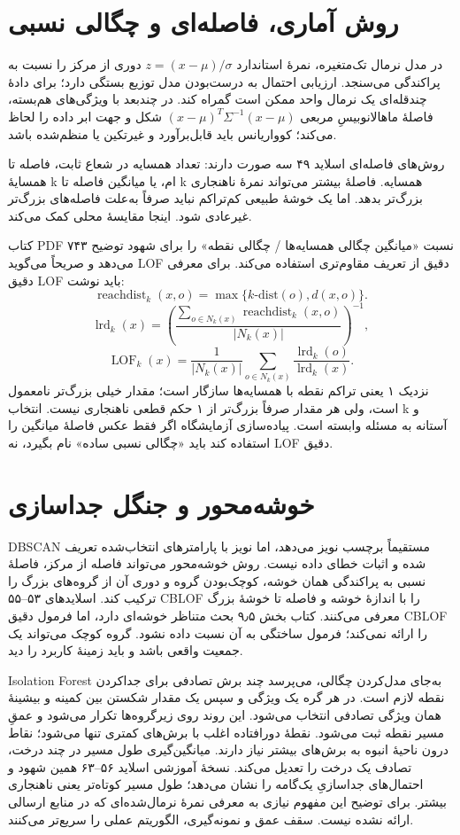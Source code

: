 \documentclass[12pt,a4paper,oneside]{report}
\newcounter{ex}[chapter]
\begin{document}
\section{روش آماری، فاصله‌ای و چگالی نسبی}

در مدل نرمال تک‌متغیره، نمرهٔ استاندارد \(z=(x-\mu)/\sigma\) دوری از مرکز را نسبت به پراکندگی می‌سنجد. ارزیابی احتمال به درست‌بودن مدل توزیع بستگی دارد؛ برای دادهٔ چندقله‌ای یک نرمال واحد ممکن است گمراه کند. در چندبعد با ویژگی‌های هم‌بسته، فاصلهٔ ماهالانوبیسِ مربعی \((x-\mu)^T\Sigma^{-1}(x-\mu)\) شکل و جهت ابر داده را لحاظ می‌کند؛ کوواریانس باید قابل‌برآورد و غیرتکین یا منظم‌شده باشد.

روش‌های فاصله‌ای اسلاید ۴۹ سه صورت دارند: تعداد همسایه در شعاع ثابت، فاصله تا همسایهٔ k ام، یا میانگین فاصله تا k همسایه. فاصلهٔ بیشتر می‌تواند نمرهٔ ناهنجاری بزرگ‌تر بدهد. اما یک خوشهٔ طبیعی کم‌تراکم نباید صرفاً به‌علت فاصله‌های بزرگ‌تر غیرعادی شود. اینجا مقایسهٔ محلی کمک می‌کند.

کتاب PDF ۷۴۳ نسبت «میانگین چگالی همسایه‌ها / چگالی نقطه» را برای شهود توضیح می‌دهد و صریحاً می‌گوید LOF دقیق از تعریف مقاوم‌تری استفاده می‌کند. برای معرفی دقیق LOF باید نوشت: \[
\operatorname{reachdist}_k(x,o)=\max\{k\text{-dist}(o),d(x,o)\}.
\] \[
\operatorname{lrd}_k(x)=\left(\frac{\sum_{o\in N_k(x)}\operatorname{reachdist}_k(x,o)}{|N_k(x)|}\right)^{-1},
\] \[
\operatorname{LOF}_k(x)=\frac{1}{|N_k(x)|}\sum_{o\in N_k(x)}\frac{\operatorname{lrd}_k(o)}{\operatorname{lrd}_k(x)}.
\] نزدیک ۱ یعنی تراکم نقطه با همسایه‌ها سازگار است؛ مقدار خیلی بزرگ‌تر نامعمول است، ولی هر مقدار صرفاً بزرگ‌تر از ۱ حکم قطعی ناهنجاری نیست. انتخاب k و آستانه به مسئله وابسته است. پیاده‌سازی آزمایشگاه اگر فقط عکس فاصلهٔ میانگین را استفاده کند باید «چگالی نسبی ساده» نام بگیرد، نه LOF دقیق.

\section{خوشه‌محور و جنگل جداسازی}

DBSCAN مستقیماً برچسب نویز می‌دهد، اما نویز با پارامترهای انتخاب‌شده تعریف شده و اثبات خطای داده نیست. روش خوشه‌محور می‌تواند فاصله از مرکز، فاصلهٔ نسبی به پراکندگی همان خوشه، کوچک‌بودن گروه و دوری آن از گروه‌های بزرگ را ترکیب کند. اسلایدهای ۵۳--۵۵ CBLOF را با اندازهٔ خوشه و فاصله تا خوشهٔ بزرگ معرفی می‌کنند. کتاب بخش ۹٫۵ بحث متناظر خوشه‌ای دارد، اما فرمول دقیق CBLOF را ارائه نمی‌کند؛ فرمول ساختگی به آن نسبت داده نشود. گروه کوچک می‌تواند یک جمعیت واقعی باشد و باید زمینهٔ کاربرد را دید.

Isolation Forest به‌جای مدل‌کردن چگالی، می‌پرسد چند برش تصادفی برای جداکردن نقطه لازم است. در هر گره یک ویژگی و سپس یک مقدار شکستن بین کمینه و بیشینهٔ همان ویژگی تصادفی انتخاب می‌شود. این روند روی زیرگروه‌ها تکرار می‌شود و عمقِ مسیر نقطه ثبت می‌شود. نقطهٔ دورافتاده اغلب با برش‌های کمتری تنها می‌شود؛ نقاط درون ناحیهٔ انبوه به برش‌های بیشتر نیاز دارند. میانگین‌گیری طول مسیر در چند درخت، تصادف یک درخت را تعدیل می‌کند. نسخهٔ آموزشی اسلاید ۵۶--۶۳ همین شهود و احتمال‌های جداسازیِ یک‌گامه را نشان می‌دهد؛ طول مسیر کوتاه‌تر یعنی ناهنجاری بیشتر. برای توضیح این مفهوم نیازی به معرفی نمرهٔ نرمال‌شده‌ای که در منابع ارسالی ارائه نشده نیست. سقف عمق و نمونه‌گیری، الگوریتم عملی را سریع‌تر می‌کنند.
\end{document}
